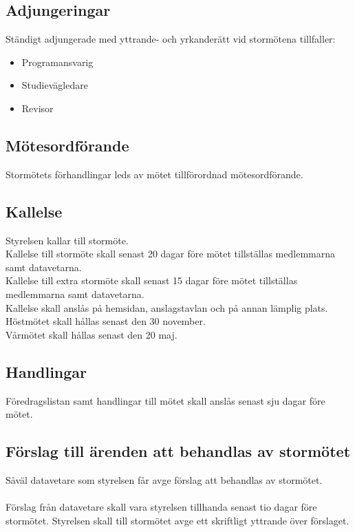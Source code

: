 \documentclass[a4paper]{article}
\begin{document}
{{  \subsection{Adjungeringar}
  Ständigt adjungerade med yttrande- och yrkanderätt vid stormötena tillfaller: 
  \begin{itemize}
  \item Programansvarig 
  \item Studievägledare
  \item Revisor
  \end{itemize}
  \subsection{Mötesordförande}
  Stormötets förhandlingar leds av mötet tillförordnad mötesordförande.
  \subsection{Kallelse}
  Styrelsen kallar till stormöte.\\
  Kallelse till stormöte skall senast 20 dagar före mötet tillställas medlemmarna samt datavetarna.\\
  Kallelse till extra stormöte skall senast 15 dagar före mötet tillställas medlemmarna samt datavetarna.\\
  Kallelse skall anslås på hemsidan, anslagstavlan och på annan lämplig plats.\\
  Höstmötet skall hållas senast den 30 november.\\
  Vårmötet skall hållas senast den 20 maj.
  \subsection{Handlingar}
  Föredragslistan samt handlingar till mötet skall anslås senast sju dagar före mötet.
  \subsection{Förslag till ärenden att behandlas av stormötet}
  Såväl datavetare som styrelsen får avge förslag att behandlas av stormötet.\\
  \\
Förslag från datavetare skall vara styrelsen tillhanda senast tio dagar före stormötet. Styrelsen skall till stormötet avge ett skriftligt yttrande över förslaget.
}}
\end{document}
